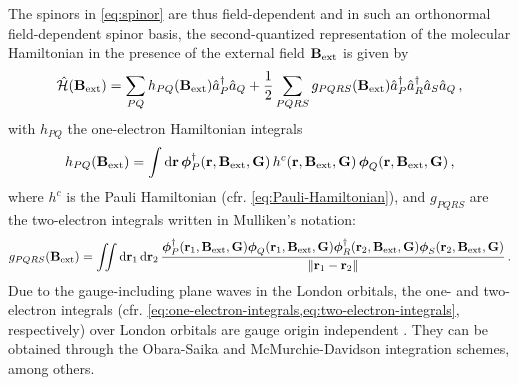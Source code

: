 \documentclass[journal=jctc,manuscript=article]{achemso}
\begin{document}
        The spinors in \cref{eq:spinor} are thus field-dependent and in such an orthonormal field-dependent spinor basis, the second-quantized representation of the molecular Hamiltonian in the presence of the external field $\vb{B}_{\text{ext}}$ is given by\cite{Helgaker.1991}
        \begin{equation} \label{eq:molecular-magnetic-Hamiltonian}
            \hat{\mathcal{H}}(\vb{B}_{\text{ext}})
            = \sum_{PQ}
                h_{PQ}(\vb{B}_{\text{ext}})
                \hat{a}^\dagger_P \hat{a}_Q
            + \frac{1}{2}
                \sum_{PQRS}
                    g_{PQRS}(\vb{B}_{\text{ext}})
                    \hat{a}^\dagger_P \hat{a}^\dagger_R
                    \hat{a}_S \hat{a}_Q
            \thinspace ,
        \end{equation}
        with $h_{PQ}$ the one-electron Hamiltonian integrals
        \begin{equation} \label{eq:one-electron-integrals}
            h_{PQ}(\vb{B}_{\text{ext}})
            = \int \dd{\vb{r}}
                \boldsymbol{\phi}_P^\dagger(\vb{r}, \vb{B}_{\text{ext}}, \vb{G})
                \thinspace
                h^c(\vb{r}, \vb{B}_{\text{ext}}, \vb{G})
                \thinspace
                \boldsymbol{\phi}_Q(\vb{r}, \vb{B}_{\text{ext}}, \vb{G})
            \thinspace ,
        \end{equation}
        where $h^c$ is the Pauli Hamiltonian (cfr. \cref{eq:Pauli-Hamiltonian}), and $g_{PQRS}$ are the two-electron integrals written in Mulliken's notation:
        \begin{equation} \label{eq:two-electron-integrals}
            g_{PQRS}(\vb{B}_{\text{ext}})
            = \iint \dd{\vb{r}_1} \dd{\vb{r}_2}
                \frac{
                    \boldsymbol{\phi}_P^\dagger(\vb{r}_1, \vb{B}_{\text{ext}}, \vb{G})
                    \boldsymbol{\phi}_Q(\vb{r}_1, \vb{B}_{\text{ext}}, \vb{G})
                    \boldsymbol{\phi}_R^\dagger(\vb{r}_2, \vb{B}_{\text{ext}}, \vb{G})
                    \boldsymbol{\phi}_S(\vb{r}_2, \vb{B}_{\text{ext}}, \vb{G})
                }{
                    \norm{\vb{r}_1 - \vb{r}_2}
                }
            \thinspace .
        \end{equation}
        Due to the gauge-including plane waves in the London orbitals, the one- and two-electron integrals (cfr. \cref{eq:one-electron-integrals,eq:two-electron-integrals}, respectively) over London orbitals are gauge origin independent \cite{Hall.1973, Helgaker.1991}. 
        They can be obtained through the Obara-Saika \cite{Obara.1986, Tellgren.2008, Sun.2019} and McMurchie-Davidson \cite{McMurchie.1978, Tellgren.2008} integration schemes, among others. \cite{Irons.2017, Pausch.2020}
\end{document}
